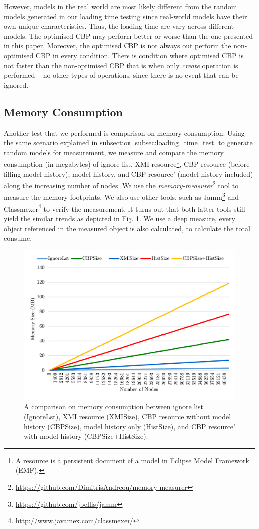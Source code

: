 \documentclass{llncs}
\begin{document}
However, models in the real world are most likely different from the random models generated in our loading time testing since real-world models have their own unique characteristics. Thus, the loading time are vary across different models. The optimised CBP may perform better or worse than the one presented in this paper. Moreover, the optimised CBP is not always out perform the non-optimised CBP in every condition. There is condition where optimised CBP is not faster than the non-optimised CBP that is when only \emph{create} operation is performed -- no other types of operations, since there is no event that can be ignored. 

\subsection{Memory Consumption}
\label{subsec:memory_consumption}
Another test that we performed is comparison on memory consumption. Using the same scenario explained in subsection \ref{subsec:loading_time_test} to generate random models for measurement, we measure and compare the memory consumption (in megabytes) of ignore list, XMI resource\footnote{A resource is a persistent document of a model in Eclipse Model Framework (EMF).}, CBP resource (before filling model history), model history, and CBP resource' (model history included) along the increasing number of nodes. We use the \emph{memory-measurer}\footnote{\url{https://github.com/DimitrisAndreou/memory-measurer}} tool to measure the memory footprints. We also use other tools, such as Jamm\footnote{\url{https://github.com/jbellis/jamm}} and Classmexer\footnote{\url{http://www.javamex.com/classmexer/}} to verify the measurement. It turns out that both latter tools still yield the similar trends as depicted in Fig. \ref{fig:memory_use}. We use a deep measure, every object referenced in the measured object is also calculated, to calculate the total consume.

\begin{figure}[ht]
\centering
\includegraphics[width=\linewidth]{memory_use}
\caption{A comparison on memory consumption between ignore list (IgnoreLst), XMI resource (XMISize), CBP resource without model history (CBPSize), model history only (HistSize), and CBP resource' with model history (CBPSize+HistSize).}
\label{fig:memory_use}
\end{figure}
\end{document}
